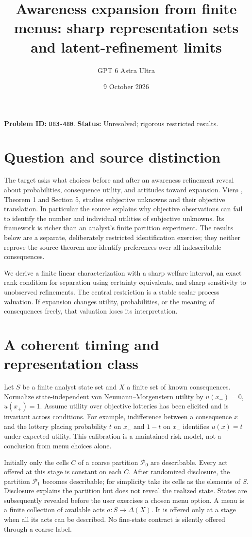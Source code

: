 \documentclass[11pt]{article}
\title{Awareness expansion from finite menus: sharp representation sets and latent-refinement limits}
\author{GPT 6 Astra Ultra}
\date{9 October 2026}
\theoremstyle{remark}
\begin{document}
\maketitle
\noindent\textbf{Problem ID:} \texttt{D83-480}. \textbf{Status:} Unresolved; rigorous restricted results.

\section{Question and source distinction}
The target asks what choices before and after an awareness refinement reveal about probabilities, consequence utility, and attitudes toward expansion. Vier\o{} \cite{viero}, Theorem 1 and Section 5, studies subjective unknowns and their objective translation. In particular the source explains why objective observations can fail to identify the number and individual utilities of subjective unknowns. Its framework is richer than an analyst's finite partition experiment. The results below are a separate, deliberately restricted identification exercise; they neither reprove the source theorem nor identify preferences over all indescribable consequences.

We derive a finite linear characterization with a sharp welfare interval, an exact rank condition for separation using certainty equivalents, and sharp sensitivity to unobserved refinements. The central restriction is a stable scalar process valuation. If expansion changes utility, probabilities, or the meaning of consequences freely, that valuation loses its interpretation.

\section{A coherent timing and representation class}
Let $S$ be a finite analyst state set and $X$ a finite set of known consequences. Normalize state-independent von Neumann--Morgenstern utility by $u(x_-) =0$, $u(x_+)=1$. Assume utility over objective lotteries has been elicited and is invariant across conditions. For example, indifference between a consequence $x$ and the lottery placing probability $t$ on $x_+$ and $1-t$ on $x_-$ identifies $u(x)=t$ under expected utility. This calibration is a maintained risk model, not a conclusion from menu choices alone.

Initially only the cells $C$ of a coarse partition $\mathcal P_0$ are describable. Every act offered at this stage is constant on each $C$. After randomized disclosure, the partition $\mathcal P_1$ becomes describable; for simplicity take its cells as the elements of $S$. Disclosure explains the partition but does not reveal the realized state. States are subsequently revealed before the user exercises a chosen menu option. A menu is a finite collection of available acts $a:S\to\Delta(X)$. It is offered only at a stage when all its acts can be described. No fine-state contract is silently offered through a coarse label.
\end{document}

